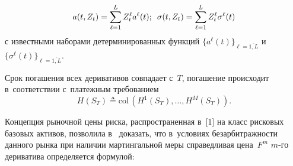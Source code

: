 \begin{multicols}{2}
  \noindent
  $$
  a(t,Z_t) = \sum\limits_{\ell=1}^L Z_t^{\ell} a^{\ell}(t); \enskip  \sigma(t,Z_t) = \sum\limits_{\ell=1}^L Z_t^{\ell}  \sigma^{\ell}(t)
$$
с известными наборами детерминированных функций $\{a^{\ell}(t)\}_{\ell=\overline{1,L}}$  и~$\{\sigma^{\ell}(t)\}_{\ell=\overline{1,L}}$.

Срок погашения всех деривативов совпадает с~$T$, погашение происходит в~соответствии с~пла\-теж\-ным требованием 
$$
H(S_T) \triangleq \mathrm{col}\,(H^1(S_T), \ldots, H^M(S_T)).
$$

Концепция рыночной цены риска, рас\-про\-стра\-нен\-ная в~[1] на класс рис\-ко\-вых базовых активов, поз\-во\-ли\-ла в~\cite{B_23_1_IA} доказать, что в~условиях 
без\-ар\-бит\-раж\-ности данного рынка при наличии мартингальной меры спра\-вед\-ли\-вая цена~$F^m$ $m$-го дериватива определяется фор\-мулой:

\pagebreak


\end{multicols}
